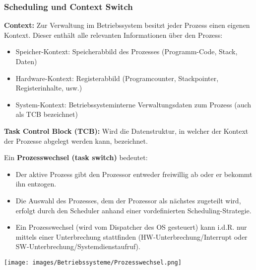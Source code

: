 \subsubsection{Scheduling und Context Switch}
\textbf{Context:} Zur Verwaltung im Betriebssystem besitzt jeder Prozess einen eigenen Kontext. Dieser enthält alle relevanten Informationen über den Prozess: 
\begin{itemize}
    \item Speicher-Kontext: Speicherabbild des Prozesses (Programm-Code, Stack, Daten)
    \item Hardware-Kontext: Registerabbild (Programcounter, Stackpointer, Registerinhalte, usw.)
    \item System-Kontext: Betriebssysteminterne Verwaltungsdaten zum Prozess (auch als TCB bezeichnet)
\end{itemize}
\textbf{Task Control Block (TCB):}
Wird die Datenstruktur, in welcher der Kontext der
Prozesse abgelegt werden kann, bezeichnet. \newline
\begin{minipage}{0.7\linewidth}
Ein \textbf{Prozesswechsel (task switch)} bedeutet:
\begin{itemize}
    \item Der aktive Prozess gibt den Prozessor entweder freiwillig ab oder er bekommt ihn entzogen. 
    \item Die Auswahl des Prozesses, dem der Prozessor als nächstes zugeteilt wird, erfolgt durch den Scheduler anhand einer vordefinierten Scheduling-Strategie.
    \item Ein Prozesswechsel (wird vom Dispatcher des OS gesteuert) kann i.d.R. nur mittels einer Unterbrechung stattfinden (HW-Unterbrechung/Interrupt oder SW-Unterbrechung/Systemdienstaufruf).
\end{itemize}
\end{minipage}
\begin{minipage}{0.3\linewidth}
\texttt{[image: images/Betriebssysteme/Prozesswechsel.png]}
\end{minipage}

